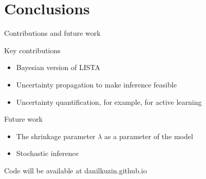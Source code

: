 \documentclass[9pt]{beamer}
\begin{document}
\section{Conclusions}
\begin{frame}{Contributions and future work}
\begin{block}{Key contributions}
  \begin{itemize}
   \item Bayesian version of LISTA
    \item Uncertainty propagation to make inference feasible
    \item Uncertainty quantification, for example, for active learning
  \end{itemize}
\end{block}
  \begin{block}{Future work}
    \begin{itemize}
      \item The shrinkage parameter $\lambda$ as a parameter of the model
      \item Stochastic inference
    \end{itemize}
  \end{block}
  \begin{block}{}
  Code will be available at danilkuzin.github.io
  \end{block}
\end{frame}
\end{document}
